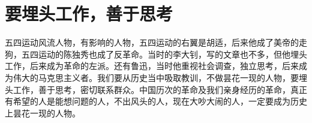 \section[要埋头工作，善于思考（一九六七年二月）]{要埋头工作，善于思考}


五四运动风流人物，有影响的人物，五四运动的右翼是胡适，后来他成了美帝的走狗，五四运动的陈独秀也成了反革命。当时的李大钊，写的文章也不多，但他埋头工作，后来成为革命的左派。还有鲁迅，当时他重视社会调查，独立思考，后来成为伟大的马克思主义者。我们要从历史当中吸取教训，不做昙花一现的人物，要埋头工作，善于思考，密切联系群众。中国历次的革命及我们亲身经历的革命，真正有希望的人是能想问题的人，不出风头的人，现在大吵大闹的人，一定要成为历史上昙花一现的人物。

